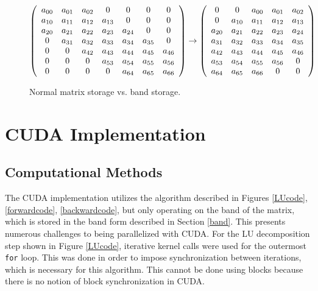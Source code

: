 \documentclass[12pt]{article}
\begin{document}
\begin{figure}[H]
\caption{Normal matrix storage vs. band storage.}
\label{bandstorage}
$$
\left(
\begin{array}{c c c c c c c}
a_{00} & a_{01} & a_{02} & 0 & 0 & 0 & 0\\
a_{10} & a_{11} & a_{12} & a_{13} & 0 & 0 & 0\\
a_{20} & a_{21} & a_{22} & a_{23} & a_{24} & 0 & 0\\
     0 & a_{31} & a_{32} & a_{33} & a_{34} & a_{35} & 0\\
     0 &      0 & a_{42} & a_{43} & a_{44} & a_{45} & a_{46}\\
     0 &      0 &      0 & a_{53} & a_{54} & a_{55} & a_{56}\\
     0 &      0 &      0 &      0 & a_{64} & a_{65} & a_{66}\\
\end{array}
\right)
\rightarrow
\left(
\begin{array}{c c c c c}
     0 &      0 & a_{00} & a_{01} & a_{02}\\
     0 & a_{10} & a_{11} & a_{12} & a_{13}\\
a_{20} & a_{21} & a_{22} & a_{23} & a_{24}\\
a_{31} & a_{32} & a_{33} & a_{34} & a_{35}\\
a_{42} & a_{43} & a_{44} & a_{45} & a_{46}\\
a_{53} & a_{54} & a_{55} & a_{56} & 0     \\
a_{64} & a_{65} & a_{66} & 0      & 0
\end{array}
\right)
$$
\end{figure}

\section{CUDA Implementation}
\label{sec:implimentation}

\subsection{Computational Methods}

The CUDA implementation utilizes the algorithm described in Figures
\ref{LUcode}, \ref{forwardcode}, \ref{backwardcode}, but only operating on the
band of the matrix, which is stored in the band form described in Section
\ref{band}. This presents numerous challenges to being parallelized with CUDA.
For the LU decomposition step shown in Figure \ref{LUcode}, iterative kernel
calls were used for the outermost \texttt{for} loop. This was done in order to
impose synchronization between iterations, which is necessary for this
algorithm. This cannot be done using blocks because there is no notion of block
synchronization in CUDA.
\end{document}
